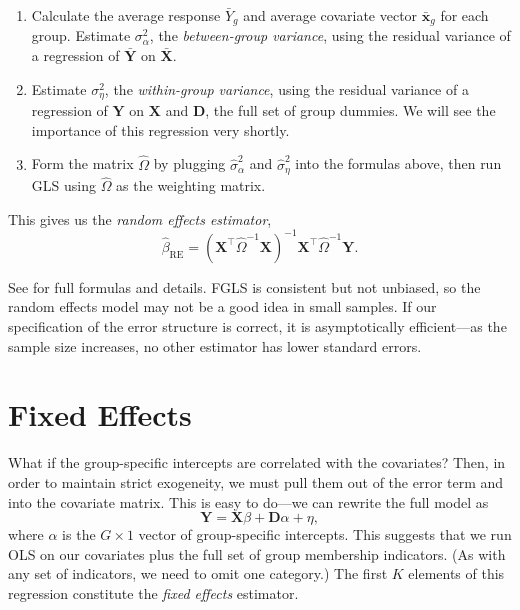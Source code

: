 \documentclass[
  12pt,
  oneside,openany]{book}
\begin{document}
\begin{enumerate}
\def\labelenumi{\arabic{enumi}.}
\item
  Calculate the average response \(\bar{Y}_g\) and average covariate vector \(\bar{\mathbf{x}}_g\) for each group. Estimate \(\sigma^2_\alpha\), the \emph{between-group variance}, using the residual variance of a regression of \(\bar{\mathbf{Y}}\) on \(\bar{\mathbf{X}}\).
\item
  Estimate \(\sigma^2_\eta\), the \emph{within-group variance}, using the residual variance of a regression of \(\mathbf{Y}\) on \(\mathbf{X}\) and \(\mathbf{D}\), the full set of group dummies. We will see the importance of this regression very shortly.
\item
  Form the matrix \(\hat{\Omega}\) by plugging \(\hat{\sigma}^2_\alpha\) and \(\hat{\sigma}^2_\eta\) into the formulas above, then run GLS using \(\hat{\Omega}\) as the weighting matrix.
\end{enumerate}

This gives us the \emph{random effects estimator},
\[
\hat{\beta}_{\text{RE}} = (\mathbf{X}^\top \hat{\Omega}^{-1} \mathbf{X})^{-1} \mathbf{X}^\top \hat{\Omega}^{-1} \mathbf{Y}.
\]

See \citet[392--395]{Johnston:1997um} for full formulas and details. FGLS is consistent but not unbiased, so the random effects model may not be a good idea in small samples. If our specification of the error structure is correct, it is asymptotically efficient---as the sample size increases, no other estimator has lower standard errors.

\hypertarget{fixed-effects}{%
\section{Fixed Effects}\label{fixed-effects}}

What if the group-specific intercepts are correlated with the covariates? Then, in order to maintain strict exogeneity, we must pull them out of the error term and into the covariate matrix. This is easy to do---we can rewrite the full model as
\[
\mathbf{Y} = \mathbf{X} \beta + \mathbf{D} \alpha + \eta,
\]
where \(\alpha\) is the \(G \times 1\) vector of group-specific intercepts. This suggests that we run OLS on our covariates plus the full set of group membership indicators. (As with any set of indicators, we need to omit one category.) The first \(K\) elements of this regression constitute the \emph{fixed effects} estimator.
\end{document}
